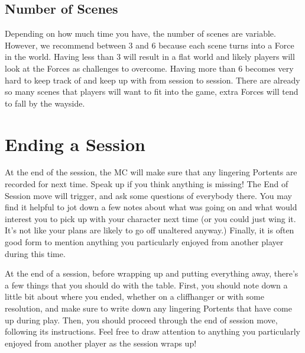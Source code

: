 \documentclass[
  oneside,
  statementpaper,
  9pt]{memoir}
\begin{document}
\hypertarget{number-of-scenes}{%
\subsection{Number of Scenes}\label{number-of-scenes}}

\begin{MC}

Depending on how much time you have, the number of scenes are variable. However, we recommend between 3 and 6 because each scene turns into a Force in the world. Having less than 3 will result in a flat world and likely players will look at the Forces as challenges to overcome. Having more than 6 becomes very hard to keep track of and keep up with from session to session. There are already so many scenes that players will want to fit into the game, extra Forces will tend to fall by the wayside.

\end{MC}

\hypertarget{ending-a-session-1}{%
\section{Ending a Session}\label{ending-a-session-1}}

\begin{Player}

At the end of the session, the MC will make sure that any lingering Portents are recorded for next time. Speak up if you think anything is missing! The End of Session move will trigger, and ask some questions of everybody there. You may find it helpful to jot down a few notes about what was going on and what would interest you to pick up with your character next time (or you could just wing it. It's not like your plans are likely to go off unaltered anyway.) Finally, it is often good form to mention anything you particularly enjoyed from another player during this time.

\end{Player}

\begin{MC}

At the end of a session, before wrapping up and putting everything away, there’s a few things that you should do with the table. First, you should note down a little bit about where you ended, whether on a cliffhanger or with some resolution, and make sure to write down any lingering Portents that have come up during play. Then, you should proceed through the end of session move, following its instructions. Feel free to draw attention to anything you particularly enjoyed from another player as the session wraps up!

\end{MC}
\end{document}
